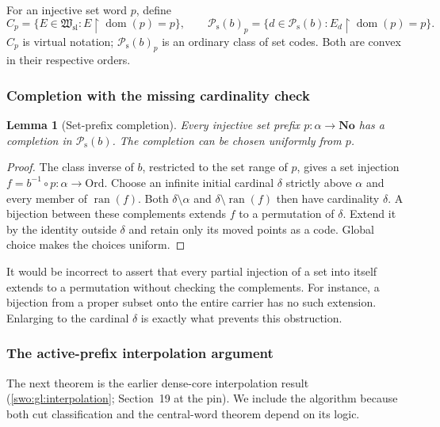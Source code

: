 \documentclass[11pt]{article}
\newtheorem{lemma}[lemma]{Lemma}
\theoremstyle{definition}
\theoremstyle{remark}
\newcommand{\No}{\mathbf{No}}
\newcommand{\Ord}{\mathrm{Ord}}
\newcommand{\Hsl}{\mathfrak W_{\mathrm{sl}}}
\newcommand{\Psupp}{\mathcal P_{\mathrm{s}}}
\newcommand{\ran}{\operatorname{ran}}
\newcommand{\dom}{\operatorname{dom}}
\newcommand{\restr}{\mathbin{\upharpoonright}}
\begin{document}
For an injective set word $p$, define
\[
 C_p=\{E\in \Hsl:E\restr\dom(p)=p\},\qquad
 \Psupp(b)_p=\{d\in \Psupp(b):E_d\restr\dom(p)=p\}.
\]
$C_p$ is virtual notation; $\Psupp(b)_p$ is an ordinary class of set codes.
Both are convex in their respective orders.

\subsubsection{Completion with the missing cardinality check}

\begin{lemma}[Set-prefix completion]\label{swo:fs:lem:completion}
Every injective set prefix $p:\alpha\to\No$ has a completion in $\Psupp(b)$.
The completion can be chosen uniformly from $p$.
\end{lemma}
\begin{proof}
The class inverse of $b$, restricted to the set range of $p$, gives a
set injection $f=b^{-1}\circ p:\alpha\to\Ord$. Choose an infinite
initial cardinal $\delta$ strictly above $\alpha$ and every member of
$\ran(f)$. Both $\delta\setminus\alpha$ and
$\delta\setminus\ran(f)$ then have cardinality $\delta$. A bijection
between these complements extends $f$ to a permutation of $\delta$.
Extend it by the identity outside $\delta$ and retain only its moved
points as a code. Global choice makes the choices uniform.
\end{proof}

It would be incorrect to assert that every partial injection of a set
into itself extends to a permutation without checking the complements.
For instance, a bijection from a proper subset onto the entire carrier
has no such extension. Enlarging to the cardinal $\delta$ is exactly
what prevents this obstruction.

\subsubsection{The active-prefix interpolation argument}

The next theorem is the earlier dense-core interpolation result
(\cref{swo:gl:interpolation}; Section~19 at the pin). We include the algorithm because both
cut classification and the central-word theorem depend on its logic.
\end{document}
